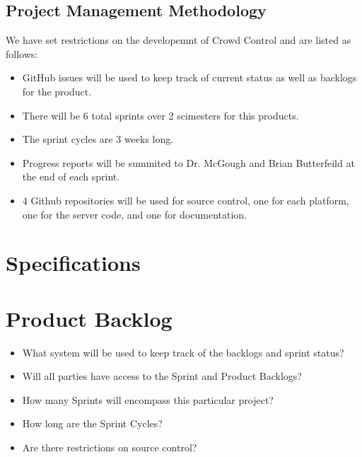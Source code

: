 \subsection{Project  Management Methodology}

We have set restrictions on the developemnt of Crowd Control and are listed as follows:
 
\begin{itemize}
\item GitHub issues will be used to keep track of current status as well as backlogs for the product.
\item There will be 6 total sprints over 2 scimesters for this products.
\item The sprint cycles are 3 weeks long.
\item Progress reports will be summited to Dr. McGough and Brian Butterfeild at the end of each sprint.
\item 4 Github repositories will be used for source control, one for each platform, one for the server code, and one for documentation. 
\end{itemize}


\section{Specifications}

\section{Product Backlog}

 
\begin{itemize}
\item What system will be used to keep track of the backlogs and sprint status?
\item Will all parties have access to the Sprint and Product Backlogs?
\item How many Sprints will encompass this particular project?
\item How long are the Sprint Cycles?
\item Are there restrictions on source control? 
\end{itemize}


